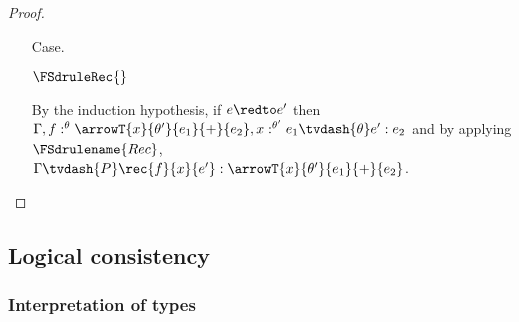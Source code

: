 \begin{proof}
\begin{itemize}
  \item[Case.]\ \\
    \begin{center}
      $\FSdruleRec{}$
    \end{center}
    By the induction hypothesis, if $e \redto e'$ then 
    $\Gamma, f:^\theta \arrowT{x}{\theta'}{e_1}{+}{e_2},x:^{\theta'} e_1 \tvdash{\theta} e':e_2$ 
    and by applying $\FSdrulename{Rec}$,
    $\Gamma \tvdash{P} \rec{f}{x}{e'}:\arrowT{x}{\theta'}{e_1}{+}{e_2}$.
  \end{itemize}
\end{proof}


\subsection{Logical consistency}
\label{subsec:logical_consistency}

\subsubsection{Interpretation of types}
\label{subsec:interpretation_of_types}

